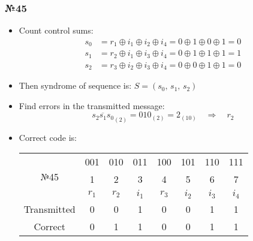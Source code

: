 \documentclass[12pt]{article}
\begin{document}
	\subsubsection{\Large №45}
	\begin{itemize}
		\item  Count control sums:
		\begin{align*}
			s_{0} &= r_{1}\oplus i_{1}\oplus i_{2}\oplus i_{4}=0\oplus1\oplus0\oplus1=0\\
			s_{1} &= r_{2}\oplus i_{1}\oplus i_{3}\oplus i_{4}=0\oplus1\oplus1\oplus1=1\\
			s_{2} &= r_{3}\oplus i_{2}\oplus i_{3}\oplus i_{4}=0\oplus0\oplus1\oplus1=0
		\end{align*}
		\item Then syndrome of sequence is: \(S = (s_{0},\,s_{1},\,s_{2})\)
		\item Find errors in the transmitted message: \[\overline{s_{2}s_{1}s_{0}}_{(2)} = 010_{(2)} = 2_{(10)} \quad \Rightarrow \quad r_{2}\]
		\item Correct code is:
		\begin{table}[h!]
			\centering
			\begin{tabular}{ |c|c|c|c|c|c|c|c| } 
				\hline
				\multirow{3}{4em}{\centering№45} & 001 & 010 & 011 & 100 & 101 & 110 & 111 \\
				& 1 & 2 & 3 & 4 & 5 & 6 & 7 \\ 
				& \(r_{1}\) & \(r_{2}\) & \(i_{1}\) & \(r_{3}\) & \(i_{2}\) & \(i_{3}\) & \(i_{4}\) \\
				\hline 
				Transmitted & 0 & 0 & 1 & 0 & 0 & 1 & 1 \\ 
				\hline
				Correct & 0 & 1 & 1 & 0 & 0 & 1 & 1\\
				\hline
			\end{tabular}
		\end{table}
	\end{itemize}
\end{document}
